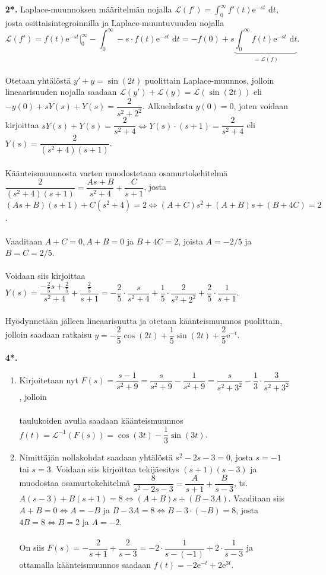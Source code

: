 \documentclass[12pt,fleqn]{article}
\begin{document}
\begin{enumerate}[label=\textbf{\arabic*.}]
\item [\textbf{2*.}] Laplace-muunnoksen määritelmän nojalla \(\displaystyle \mathcal{L}(f')=\int_0^{\infty} f'(t)\text{e}^{-st}\text{ d}t\), josta osittaisintegroinnilla ja Laplace-muuntuvuuden nojalla \[\displaystyle \mathcal{L}(f')=f(t)\text{e}^{-st} \Big|_0^{\infty}-\int_0^{\infty} -s\cdot f(t)\text{e}^{-st}\text{ d}t=-f(0)+s \underbrace{\int_0^{\infty} f(t)\text{e}^{-st}\text{ d}t}_{=\mathcal{L}(f)}.\]\\
Otetaan yhtälöstä \(y'+y=\sin (2t)\) puolittain Laplace-muunnos, jolloin lineaarisuuden nojalla saadaan \(\mathcal{L}(y')+\mathcal{L}(y)=\mathcal{L}(\sin (2t))\) eli \(-y(0)+sY(s)+Y(s)=\dfrac{2}{s^2+2^2}\). Alkuehdosta \(y(0)=0\), joten voidaan kirjoittaa \(sY(s)+Y(s)=\dfrac{2}{s^2+4}\iff Y(s)\cdot (s+1)=\dfrac{2}{s^2+4}\) eli \(Y(s)=\dfrac{2}{(s^2+4)(s+1)}\).\\
 \\
Käänteismuunnosta varten muodostetaan osamurtokehitelmä \(\dfrac{2}{(s^2+4)(s+1)}=\dfrac{As+B}{s^2+4}+\dfrac{C}{s+1}\), josta \((As+B)(s+1)+C(s^2+4)=2\iff (A+C)s^2+(A+B)s+(B+4C)=2\).\\
 \\
Vaaditaan \(A+C=0, A+B=0\) ja \(B+4C=2\), joista \(A=-2/5\) ja \(B=C=2/5\).\\
 \\
Voidaan siis kirjoittaa \(Y(s)=\dfrac{-\frac{2}{5}s+\frac{2}{5}}{s^2+4}+\dfrac{\frac{2}{5}}{s+1}=-\dfrac{2}{5}\cdot \dfrac{s}{s^2+4}+\dfrac{1}{5}\cdot \dfrac{2}{s^2+2^2}+\dfrac{2}{5}\cdot \dfrac{1}{s+1}\).\\
 \\
Hyödynnetään jälleen lineaarisuutta ja otetaan käänteismuunnos puolittain, jolloin saadaan ratkaisu \(y=-\dfrac{2}{5}\cos (2t)+\dfrac{1}{5}\sin (2t)+\dfrac{2}{5}\text{e}^{-t}\).

\item [\textbf{4*.}]
\begin{enumerate}[label=\textbf{\alph*)}]
\item Kirjoitetaan nyt \(F(s)=\dfrac{s-1}{s^2+9}=\dfrac{s}{s^2+9}-\dfrac{1}{s^2+9}=\dfrac{s}{s^2+3^2}-\dfrac{1}{3}\cdot \dfrac{3}{s^2+3^2}\), jolloin\\
 \\
taulukoiden avulla saadaan käänteismuunnos \(f(t)=\mathcal{L}^{-1} (F(s))=\cos (3t)-\dfrac{1}{3}\sin (3t)\).

\item Nimittäjän nollakohdat saadaan yhtälöstä \(s^2-2s-3=0\), josta \(s=-1\) tai \(s=3\). Voidaan siis kirjoittaa tekijäesitys \((s+1)(s-3)\) ja muodostaa osamurtokehitelmä \(\dfrac{8}{s^2-2s-3}=\dfrac{A}{s+1}+\dfrac{B}{s-3}\), ts. \(A(s-3)+B(s+1)=8\iff (A+B)s
+(B-3A)\). Vaaditaan siis \(A+B=0\iff A=-B\) ja \(B-3A=8\iff B-3\cdot (-B)=8\), josta \(4B=8\iff B=2\) ja \(A=-2\).\\
 \\
On siis \(F(s)=-\dfrac{2}{s+1}+\dfrac{2}{s-3}=-2\cdot \dfrac{1}{s-(-1)}+2\cdot \dfrac{1}{s-3}\) ja ottamalla käänteismuunnos saadaan \(f(t)=-2\text{e}^{-t}+2\text{e}^{3t}\).


\end{enumerate}
\end{enumerate}
\end{document}

